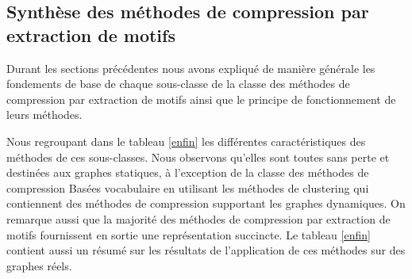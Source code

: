 \subsection{Synthèse des méthodes de compression par extraction de motifs }

	Durant les sections précédentes nous avons expliqué de manière générale les fondements de base de chaque sous-classe de la classe des méthodes de compression par extraction de motifs ainsi que le principe de fonctionnement de leurs méthodes. 
	
	Nous regroupant dans le tableau \ref{enfin} les différentes caractéristiques des méthodes de ces sous-classes. Nous observons qu'elles sont toutes sans perte et destinées aux graphes statiques, à l'exception de la classe des méthodes de compression Basées vocabulaire en utilisant les méthodes de clustering qui contiennent des méthodes de compression supportant les graphes dynamiques. On remarque aussi que la majorité des méthodes de compression par extraction de motifs fournissent en sortie une représentation succincte. Le tableau \ref{enfin} contient aussi un résumé sur les résultats de l'application de ces méthodes sur des graphes réels.

			
			

